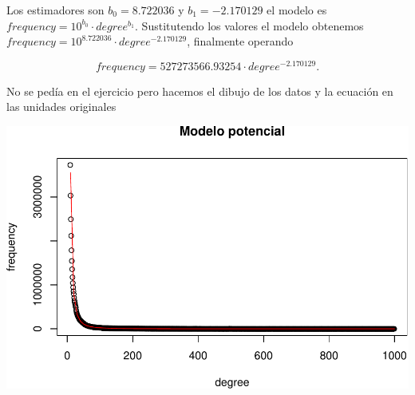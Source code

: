 \documentclass[
]{article}
\newenvironment{Shaded}{\begin{snugshade}}{\end{snugshade}}
\newcommand{\ControlFlowTok}[1]{\textcolor[rgb]{0.13,0.29,0.53}{\textbf{#1}}}
\newcommand{\DataTypeTok}[1]{\textcolor[rgb]{0.13,0.29,0.53}{#1}}
\newcommand{\DecValTok}[1]{\textcolor[rgb]{0.00,0.00,0.81}{#1}}
\newcommand{\FloatTok}[1]{\textcolor[rgb]{0.00,0.00,0.81}{#1}}
\newcommand{\KeywordTok}[1]{\textcolor[rgb]{0.13,0.29,0.53}{\textbf{#1}}}
\newcommand{\NormalTok}[1]{#1}
\newcommand{\OperatorTok}[1]{\textcolor[rgb]{0.81,0.36,0.00}{\textbf{#1}}}
\newcommand{\OtherTok}[1]{\textcolor[rgb]{0.56,0.35,0.01}{#1}}
\newcommand{\StringTok}[1]{\textcolor[rgb]{0.31,0.60,0.02}{#1}}
\begin{document}
Los estimadores son \(b_0=8.722036\) y \(b_1=-2.170129\) el modelo es
\(frequency=10^{b_0}\cdot degree^{b_1}\). Sustitutendo los valores el
modelo obtenemos \(frequency=10^{8.722036}\cdot degree^{-2.170129}\),
finalmente operando

\[frequency=527273566.93254\cdot degree^{-2.170129}.\]

No se pedía en el ejercicio pero hacemos el dibujo de los datos y la
ecuación en las unidades originales

\begin{Shaded}
\end{Shaded}

\includegraphics{taller_problemas_resueltos_extra_1_files/figure-latex/unnamed-chunk-58-1.pdf}
\end{document}
